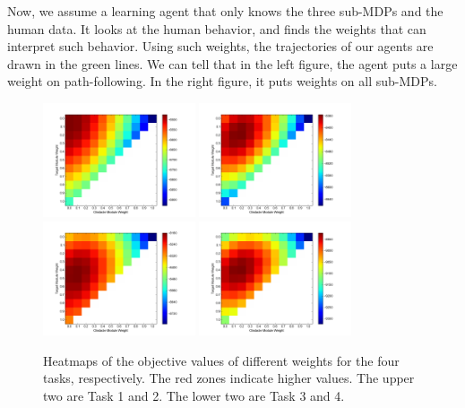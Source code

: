 \documentclass[11pt]{article} %
\begin{document}
Now, we assume a learning agent that only knows the three sub-MDPs and the human
data. It looks at the human behavior, and finds the weights that can interpret
such behavior. Using such weights, the trajectories of our agents are drawn in
the green lines. We can tell that in the left figure, the agent puts a large
weight on path-following. In the right figure, it puts weights on all sub-MDPs.

\begin{figure}[h!]
\centering
\includegraphics[width=0.4\textwidth]{objValuesTask1.png}
\includegraphics[width=0.4\textwidth]{objValuesTask2.png}
\includegraphics[width=0.4\textwidth]{objValuesTask3.png}
\includegraphics[width=0.4\textwidth]{objValuesTask4.png}
\caption{Heatmaps of the objective values of different weights for the four
tasks, respectively. The red zones indicate higher values. The upper two are
Task 1 and 2. The lower two are Task 3 and 4.}
\label{fig:heatmap}
\end{figure}
\end{document}
